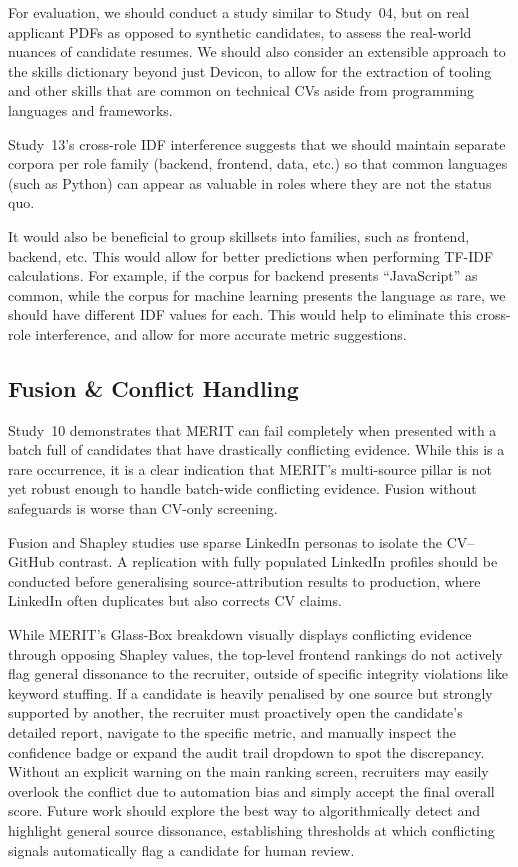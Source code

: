 For evaluation, we should conduct a study similar to Study~04, but on real applicant PDFs as opposed to synthetic 
candidates, to assess the real-world nuances of candidate resumes. We should also consider an extensible approach 
to the skills dictionary beyond just Devicon, to allow for the extraction of tooling and other skills that are common 
on technical CVs aside from programming languages and frameworks.


Study~13's cross-role IDF interference suggests that we should maintain separate corpora per role family (backend, frontend, data, etc.)
so that common languages (such as Python) can appear as valuable in roles where they are not the status quo. 

It would also be beneficial to group skillsets into families, such as frontend, backend, etc. This would allow for better predictions
when performing TF-IDF calculations. For example, if the corpus for backend presents ``JavaScript'' as common, while the corpus for
machine learning presents the language as rare, we should have different IDF values for each. This would help to eliminate this cross-role interference,
and allow for more accurate metric suggestions.


\subsection{Fusion \& Conflict Handling}
\label{subsec:future-fusion}

Study~10 demonstrates that MERIT can fail completely when presented with a batch full of candidates that have drastically conflicting evidence.
While this is a rare occurrence, it is a clear indication that MERIT's multi-source pillar is not yet robust enough to handle batch-wide conflicting evidence.
Fusion without safeguards is worse than CV-only screening.

Fusion and Shapley studies use sparse LinkedIn personas to isolate the CV--GitHub contrast. A replication with fully populated LinkedIn profiles
should be conducted before generalising source-attribution results to production, where LinkedIn often duplicates but also corrects CV claims.

While MERIT's Glass-Box breakdown visually displays conflicting evidence through opposing Shapley values, the top-level frontend rankings do not actively flag general dissonance to the recruiter, outside of specific integrity violations like keyword stuffing. If a candidate is heavily penalised by one source but strongly supported by another, the recruiter must proactively open the candidate's detailed report, navigate to the specific metric, and manually inspect the confidence badge or expand the audit trail dropdown to spot the discrepancy. Without an explicit warning on the main ranking screen, recruiters may easily overlook the conflict due to automation bias and simply accept the final overall score. Future work should explore the best way to algorithmically detect and highlight general source dissonance, establishing thresholds at which conflicting signals automatically flag a candidate for human review.

